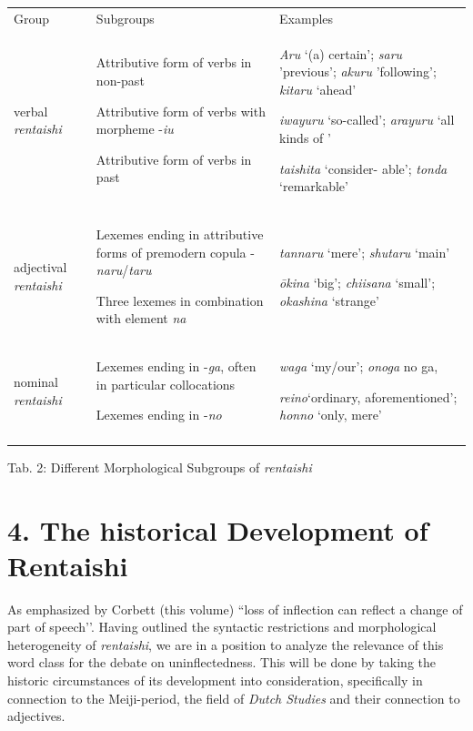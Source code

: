 \documentclass[output=paper]{langscibook}
\begin{document}
\begin{tabularx}{\textwidth}{XXX}

\lsptoprule

 Group & Subgroups & Examples\\
 verbal \textit{rentaishi} & { Attributive form of verbs in non-past}

{ Attributive form of verbs with morpheme -\textit{iu}}

 Attributive form of verbs in past & { \textit{Aru} ‘(a) certain’; \textit{saru} ’previous’; \textit{akuru} ’following’; \textit{kitaru} ‘ahead’}

{ \textit{iwayuru} ‘so-called’; \textit{arayuru} ‘all kinds of ’}

 \textit{taishita} ‘consider- able’; \textit{tonda} ‘remarkable’\\
 adjectival \textit{rentaishi} & { Lexemes ending in attributive forms of premodern copula -\textit{naru}/\textit{taru}}

 Three lexemes in combination with element \textit{na} & { \textit{tannaru} ‘mere’; \textit{shutaru} ‘main’}

 \textit{ōkina} ‘big’; \textit{chiisana} ‘small’; \textit{okashina} ‘strange’\\
 nominal \textit{rentaishi} & { Lexemes ending in -\textit{ga}, often in particular collocations}

 Lexemes ending in -\textit{no} & { \textit{waga} ‘my/our’; \textit{onoga} no ga,}

 \textit{reino}‘ordinary, aforementioned’; \textit{honno} ‘only, mere’\\
\lspbottomrule
\end{tabularx}
Tab. 2: Different Morphological Subgroups of \textit{rentaishi}

\section{4. The historical Development of Rentaishi}

As emphasized by Corbett (this volume) “loss of inflection can reflect a change of part of speech’’. Having outlined the syntactic restrictions and morphological heterogeneity of \textit{rentaishi}, we are in a position to analyze the relevance of this word class for the debate on uninflectedness. This will be done by taking the historic circumstances of its development into consideration, specifically in connection to the Meiji-period, the field of \textit{Dutch Studies} and their connection to adjectives.
\end{document}
